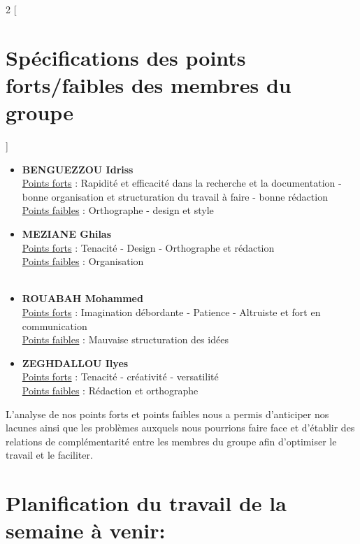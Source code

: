 \documentclass[a4paper, 12pt]{article}
\begin{document}
\begin{multicols}{2}
[
\section{Spécifications des points forts/faibles des membres du groupe }
]

\begin{itemize}
\item \textbf{BENGUEZZOU Idriss}\\
\underline{Points forts} : Rapidité et efficacité dans la recherche et la documentation - bonne organisation et structuration du travail à faire - bonne rédaction \\
\underline{Points faibles} : Orthographe -  design et style \\ 

\item \textbf{MEZIANE Ghilas}\\
\underline{Points forts} : Tenacité - Design - Orthographe et rédaction \\
\underline{Points faibles} :  Organisation  \\ \\

\item \textbf{ROUABAH Mohammed}\\
\underline{Points forts} : Imagination débordante - Patience - Altruiste et fort en communication \\
\underline{Points faibles} : Mauvaise structuration des idées \\

\item \textbf{ZEGHDALLOU Ilyes}\\
\underline{Points forts} : Tenacité - créativité - versatilité  \\
\underline{Points faibles} : Rédaction et orthographe \\
\end{itemize}
\end{multicols}

L'analyse de nos points forts et points faibles nous a permis d'anticiper nos lacunes ainsi que les problèmes auxquels nous pourrions faire face et d'établir des relations de complémentarité entre les membres du groupe afin d'optimiser le travail et le faciliter.

\section{Planification du travail de la semaine à venir:}
\end{document}
